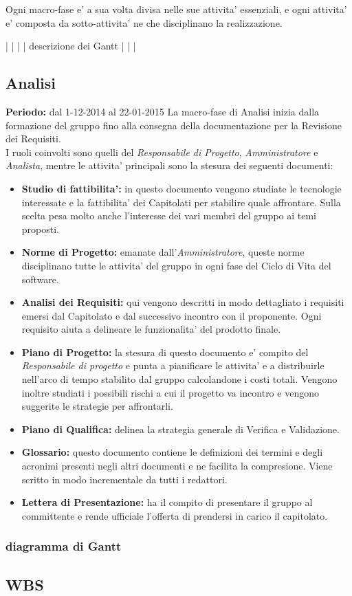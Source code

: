 Ogni macro-fase e' a sua volta divisa nelle sue attivita' essenziali, e ogni attivita' e' composta da sotto-attivita' ne che disciplinano la realizzazione.

|
|
|
|  descrizione dei Gantt
|
|
|


\subsection{Analisi}
\textbf{Periodo:} dal 1-12-2014 al 22-01-2015
La macro-fase di Analisi inizia dalla formazione del gruppo fino alla consegna della documentazione per la Revisione dei Requisiti. \\
I ruoli coinvolti sono quelli del \textit{Responsabile di Progetto}, \textit{Amministratore} e \textit{Analista}, mentre le attivita' principali sono la stesura dei seguenti documenti:

\begin{itemize}
\item \textbf{Studio di fattibilita':} in questo documento vengono studiate le tecnologie interessate e la fattibilita' dei Capitolati per stabilire quale affrontare. Sulla scelta pesa molto anche l'interesse dei vari membri del gruppo ai temi proposti.
\item \textbf{Norme di Progetto:} emanate dall'\textit{Amministratore}, queste norme disciplinano tutte le attivita' del gruppo in ogni fase del Ciclo di Vita del software.
\item \textbf{Analisi dei Requisiti:} qui vengono descritti in modo dettagliato i requisiti emersi dal Capitolato e dal successivo incontro con il proponente. Ogni requisito aiuta a delineare le funzionalita' del prodotto finale.
\item \textbf{Piano di Progetto:} la stesura di questo documento e' compito del \textit{Responsabile di progetto} e punta a pianificare le attivita' e a distribuirle nell'arco di tempo stabilito dal gruppo calcolandone i costi totali. Vengono inoltre studiati i possibili rischi a cui il progetto va incontro e vengono suggerite le strategie per affrontarli.
\item \textbf{Piano di Qualifica:} delinea la strategia generale di Verifica e Validazione.
\item \textbf{Glossario:} questo documento contiene le definizioni dei termini e degli acronimi presenti negli altri documenti e ne facilita la compresione. Viene scritto in modo incrementale da tutti i redattori.
\item \textbf{Lettera di Presentazione:} ha il compito di presentare il gruppo al committente e rende ufficiale l'offerta di prendersi in carico il capitolato.
\end{itemize}

\subsubsection{diagramma di Gantt}

\subsection{WBS}

